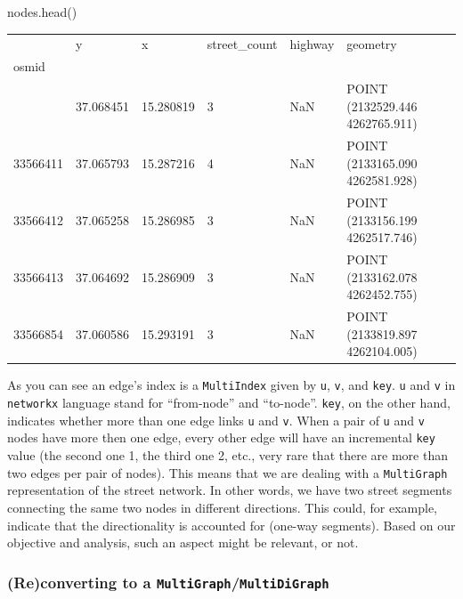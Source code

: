 \documentclass[
  letterpaper,
  DIV=11,
  numbers=noendperiod]{scrreprt}
\newenvironment{Shaded}{\begin{snugshade}}{\end{snugshade}}
\newcommand{\NormalTok}[1]{\textcolor[rgb]{0.00,0.23,0.31}{#1}}
\begin{document}
\begin{Shaded}
\begin{Highlighting}[]
\NormalTok{nodes.head()}
\end{Highlighting}
\end{Shaded}

\begin{longtable}[]{@{}llllll@{}}
\toprule\noalign{}
& y & x & street\_count & highway & geometry \\
osmid & & & & & \\
\midrule\noalign{}
\endhead
\bottomrule\noalign{}
\endlastfoot
33566408 & 37.068451 & 15.280819 & 3 & NaN & POINT (2132529.446
4262765.911) \\
33566411 & 37.065793 & 15.287216 & 4 & NaN & POINT (2133165.090
4262581.928) \\
33566412 & 37.065258 & 15.286985 & 3 & NaN & POINT (2133156.199
4262517.746) \\
33566413 & 37.064692 & 15.286909 & 3 & NaN & POINT (2133162.078
4262452.755) \\
33566854 & 37.060586 & 15.293191 & 3 & NaN & POINT (2133819.897
4262104.005) \\
\end{longtable}

As you can see an edge's index is a \texttt{MultiIndex} given by
\texttt{u}, \texttt{v}, and \texttt{key}. \texttt{u} and \texttt{v} in
\texttt{networkx} language stand for ``from-node'' and ``to-node''.
\texttt{key}, on the other hand, indicates whether more than one edge
links \texttt{u} and \texttt{v}. When a pair of \texttt{u} and
\texttt{v} nodes have more then one edge, every other edge will have an
incremental \texttt{key} value (the second one 1, the third one 2, etc.,
very rare that there are more than two edges per pair of nodes). This
means that we are dealing with a \texttt{MultiGraph} representation of
the street network. In other words, we have two street segments
connecting the same two nodes in different directions. This could, for
example, indicate that the directionality is accounted for (one-way
segments). Based on our objective and analysis, such an aspect might be
relevant, or not.

\subsubsection{\texorpdfstring{(Re)converting to a
\texttt{MultiGraph}/\texttt{MultiDiGraph}}{(Re)converting to a MultiGraph/MultiDiGraph}}\label{reconverting-to-a-multigraphmultidigraph}
\end{document}
